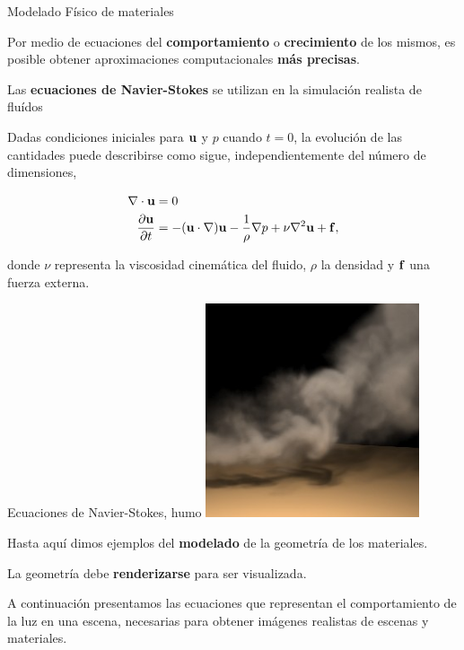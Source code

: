 \documentclass[spanish]{beamer}
\begin{document}
\begin{frame}{Modelado Físico de materiales}

Por medio de ecuaciones del \textbf{comportamiento} o \textbf{crecimiento} de los mismos, es posible obtener aproximaciones computacionales \textbf{más precisas}.

Las \textbf{ecuaciones de Navier-Stokes} se utilizan en la simulación realista de fluídos

Dadas condiciones iniciales para $\bold{u}$ y $p$ cuando $t = 0$, la evolución de las cantidades puede describirse como sigue, independientemente del número de dimensiones,

\begin{align*}
\nabla \cdot \bold{u} &= 0\\
\frac{\partial \bold{u} }{\partial t} &= - (\bold{u} \cdot \nabla) \bold{u} - \frac{1}{\rho} \nabla p + \nu \nabla^{2} \bold{u} + \bold{f},
\end{align*}

\noindent donde $\nu$ representa la viscosidad cinemática del fluido, $\rho$ la densidad y $\bold{f}$ una fuerza externa.

\end{frame}

\begin{frame}{Ecuaciones de Navier-Stokes, humo}
\center
\includegraphics[width=6.3cm]{../figures/smoke}

\end{frame}

\begin{frame}

Hasta aquí dimos ejemplos del \textbf{modelado} de la geometría de los materiales.

\vspace{0.5cm}
La geometría debe \textbf{renderizarse} para ser visualizada.
\vspace{0.5cm}

A continuación presentamos las ecuaciones que representan el comportamiento de la luz en una escena, necesarias para obtener imágenes realistas de escenas y materiales.

\end{frame}
\end{document}
